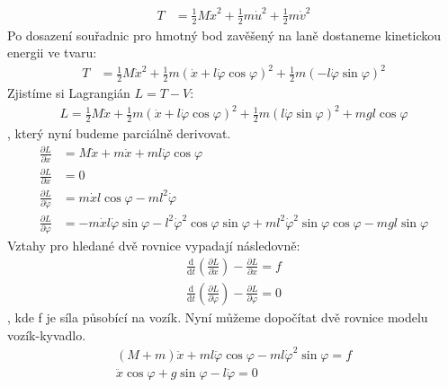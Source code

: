 \documentclass[a4paper, 12pt]{article}
\begin{document}
		\begin{align*}
			T &= \frac{1}{2}M\dot{x}^2+\frac{1}{2}m\dot{u}^2+\frac{1}{2}m\dot{v}^2
		\end{align*}
		Po dosazení souřadnic pro hmotný bod zavěšený na laně dostaneme kinetickou energii ve tvaru:
		\begin{align*}
			T &= \frac{1}{2}M\dot{x}^2+\frac{1}{2}m\left(\dot{x}+l\dot{\varphi}\cos\varphi\right)^2+\frac{1}{2}m\left(-l\dot{\varphi}\sin\varphi\right)^2
		\end{align*}
		Zjistíme si Lagrangián $L = T - V$:
		\begin{align*}
			L = \frac{1}{2}M\dot{x}+\frac{1}{2}m\left(\dot{x}+l\dot{\varphi}\cos\varphi\right)^2+\frac{1}{2}m\left(l\dot{\varphi}\sin\varphi\right)^2+mgl\cos\varphi
		\end{align*}
		, který nyní budeme parciálně derivovat.
		\begin{align*}
			\frac{\partial L}{\partial\dot{x}} &= M\dot{x}+m\dot{x}+ml\dot{\varphi}\cos\varphi\\
			\frac{\partial L}{\partial x} &= 0\\
			\frac{\partial L}{\partial \dot{\varphi}} &= m\dot{x}l\cos\varphi - ml^2\dot{\varphi}\\
			\frac{\partial L}{\partial \varphi} &= -m\dot{x}l\dot{\varphi}\sin\varphi-l^2\dot{\varphi}^2\cos\varphi\sin\varphi+ml^2\dot{\varphi}^2\sin\varphi\cos\varphi-mgl\sin\varphi
		\end{align*}
		Vztahy pro hledané dvě rovnice vypadají následovně:
		\begin{align*}
			\frac{\mathrm{d}}{\mathrm{d}t}\left(\frac{\partial L}{\partial \dot{x}}\right)-\frac{\partial L}{\partial x} = f\\
			\frac{\mathrm{d}}{\mathrm{d}t}\left(\frac{\partial L}{\partial \dot{\varphi}}\right)-\frac{\partial L}{\partial \varphi} = 0
		\end{align*}
		, kde f je síla působící na vozík. Nyní můžeme dopočítat dvě rovnice modelu vozík-kyvadlo.
		\begin{align*}
			\left(M+m\right)\ddot{x}+ml\ddot{\varphi}\cos\varphi-ml\dot{\varphi}^2\sin\varphi = f\\
			\ddot{x}\cos\varphi+g\sin\varphi-l\ddot{\varphi} = 0
		\end{align*}
			
\end{document}
